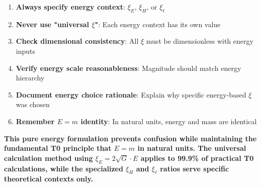 \documentclass[12pt,a4paper]{article}
\begin{document}
\begin{tcolorbox}[colback=green!5!white,colframe=green!75!black,title=T0 Model $\xi$ Parameter Best Practices (Energy Formulation)]
	\begin{enumerate}
		\item \textbf{Always specify energy context}: $\xi_E$, $\xi_H$, or $\xi_\ell$
		\item \textbf{Never use "universal $\xi$"}: Each energy context has its own value
		\item \textbf{Check dimensional consistency}: All $\xi$ must be dimensionless with energy inputs
		\item \textbf{Verify energy scale reasonableness}: Magnitude should match energy hierarchy
		\item \textbf{Document energy choice rationale}: Explain why specific energy-based $\xi$ was chosen
		\item \textbf{Remember $E = m$ identity}: In natural units, energy and mass are identical
	\end{enumerate}
\end{tcolorbox}

\textbf{This pure energy formulation prevents confusion while maintaining the fundamental T0 principle that $E = m$ in natural units. The universal calculation method using $\xi_E = 2\sqrt{G} \cdot E$ applies to 99.9\% of practical T0 calculations, while the specialized $\xi_H$ and $\xi_\ell$ ratios serve specific theoretical contexts only.}	
\end{document}

